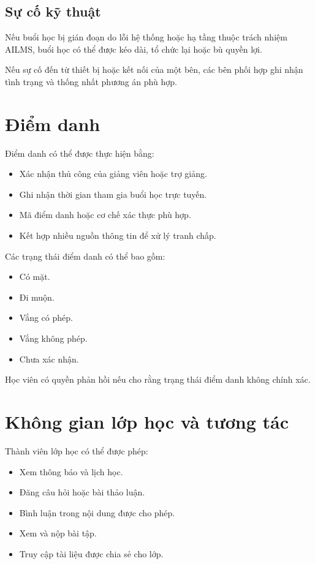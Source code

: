 \documentclass[12pt,a4paper]{article}
\begin{document}
\subsection{Sự cố kỹ thuật}

Nếu buổi học bị gián đoạn do lỗi hệ thống hoặc hạ tầng thuộc trách nhiệm AILMS,
buổi học có thể được kéo dài, tổ chức lại hoặc bù quyền lợi.

Nếu sự cố đến từ thiết bị hoặc kết nối của một bên,
các bên phối hợp ghi nhận tình trạng và thống nhất phương án phù hợp.

\section{Điểm danh}

Điểm danh có thể được thực hiện bằng:

\begin{itemize}
    \item Xác nhận thủ công của giảng viên hoặc trợ giảng.
    \item Ghi nhận thời gian tham gia buổi học trực tuyến.
    \item Mã điểm danh hoặc cơ chế xác thực phù hợp.
    \item Kết hợp nhiều nguồn thông tin để xử lý tranh chấp.
\end{itemize}

Các trạng thái điểm danh có thể bao gồm:

\begin{itemize}
    \item Có mặt.
    \item Đi muộn.
    \item Vắng có phép.
    \item Vắng không phép.
    \item Chưa xác nhận.
\end{itemize}

Học viên có quyền phản hồi nếu cho rằng trạng thái điểm danh không chính xác.

\section{Không gian lớp học và tương tác}

Thành viên lớp học có thể được phép:

\begin{itemize}
    \item Xem thông báo và lịch học.
    \item Đăng câu hỏi hoặc bài thảo luận.
    \item Bình luận trong nội dung được cho phép.
    \item Xem và nộp bài tập.
    \item Truy cập tài liệu được chia sẻ cho lớp.
\end{itemize}
\end{document}
